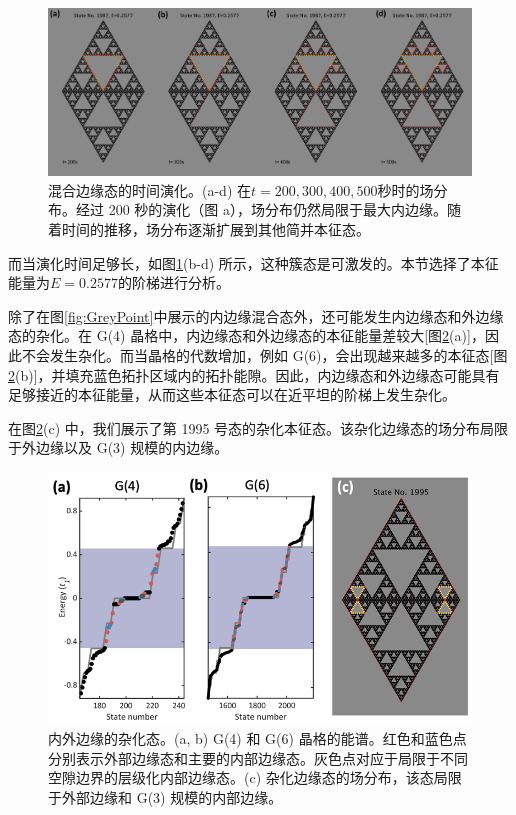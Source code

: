 \begin{figure}[htbp]
    \centering
    \includegraphics[width=1\linewidth]{figure/FracHaldTheo/TimeEvoCluster.jpg}
    \caption{混合边缘态的时间演化。(a-d) 在$t=200,300,400,500$秒时的场分布。经过 200 秒的演化（图 a），场分布仍然局限于最大内边缘。随着时间的推移，场分布逐渐扩展到其他简并本征态。}
    \label{fig:TimeEvoCluster}
\end{figure}

而当演化时间足够长，如图\ref{fig:TimeEvoCluster}(b-d) 所示，这种簇态是可激发的。本节选择了本征能量为$E=0.2577$的阶梯进行分析。

除了在图\ref{fig:GreyPoint}中展示的内边缘混合态外，还可能发生内边缘态和外边缘态的杂化。在 G(4) 晶格中，内边缘态和外边缘态的本征能量差较大[图\ref{fig:HybridState}(a)]，因此不会发生杂化。而当晶格的代数增加，例如 G(6)，会出现越来越多的本征态[图\ref{fig:HybridState}(b)]，并填充蓝色拓扑区域内的拓扑能隙。因此，内边缘态和外边缘态可能具有足够接近的本征能量，从而这些本征态可以在近平坦的阶梯上发生杂化。

在图\ref{fig:HybridState}(c) 中，我们展示了第 1995 号态的杂化本征态。该杂化边缘态的场分布局限于外边缘以及 G(3) 规模的内边缘。
\begin{figure}[htbp]
    \centering
    \includegraphics[width=0.75\linewidth]{figure/FracHaldTheo/HybridState.png}
    \caption{内外边缘的杂化态。(a, b) G(4) 和 G(6) 晶格的能谱。红色和蓝色点分别表示外部边缘态和主要的内部边缘态。灰色点对应于局限于不同空隙边界的层级化内部边缘态。(c) 杂化边缘态的场分布，该态局限于外部边缘和 G(3) 规模的内部边缘。}
    \label{fig:HybridState}
\end{figure}


